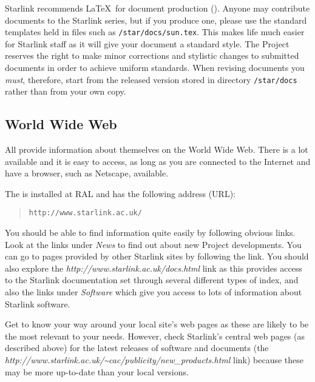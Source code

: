 \documentclass[twoside,11pt,nolof]{starlink}
\begin{document}
Starlink recommends \LaTeX\ for document production
().
Anyone may contribute documents to the Starlink series, but if you produce one,
please use the standard templates held in files such as
\texttt{/star/docs/sun.tex}.
This makes life much easier for Starlink staff as it will give your document
a standard style.
The Project reserves the right to make minor corrections and stylistic changes
to submitted documents in order to achieve uniform standards.
When revising documents you \emph{must}, therefore, start from the released
version stored in directory \texttt{/star/docs} rather than from your own copy.

\subsection{World Wide Web}

All
provide information about themselves on the World Wide Web.
There is a lot available and it is easy to access, as long as you are
connected to the Internet and have a browser, such as Netscape, available.

The
is installed at RAL and has the following address (URL):
\begin{quote}
\texttt{http://www.starlink.ac.uk/}
\end{quote}
You should be able to find information quite easily by following obvious
links.
Look at the links under \emph{News}\/ to find out about new
Project developments.
You can go to pages provided by other Starlink sites by following the
\emph{}\/ link.
You should also explore the
\emph{
{http://www.starlink.ac.uk/docs.html}}\/
link as this provides access to the Starlink documentation set through
several different types of index, and also the links under \emph{Software}\/
which give you access to lots of information about Starlink software.

Get to know your way around your local site's web pages as these are likely to
be the most relevant to your needs.
However, check Starlink's central web pages (as described above) for the
latest releases of software and documents (the
\emph{
{http://www.starlink.ac.uk/\~{}cac/publicity/new_products.html}}\/
link)
because these may be more up-to-date than your local versions.
\end{document}
